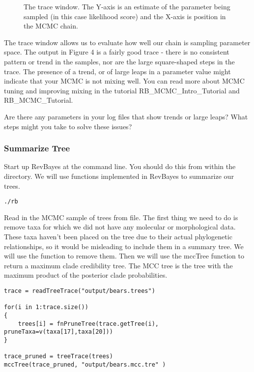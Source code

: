 \begin{figure}[h!]
\centering
{}
\caption{\small The trace window. The Y-axis is an estimate of the parameter being sampled (in this case likelihood score) and the X-axis is position in the MCMC chain.}
\label{fig:tracer}
\end{figure}
The trace window allows us to evaluate how well our chain is sampling parameter space. The output in Figure 4 is a fairly good trace - there is no consistent pattern or trend in the samples, nor are the large square-shaped steps in the trace. The presence of a trend, or of large leaps in a parameter value might indicate that your MCMC is not mixing well. You can read more about MCMC tuning and improving mixing in the tutorial RB\_MCMC\_Intro\_Tutorial and RB\_MCMC\_Tutorial. \par

Are there any parameters in your log files that show trends or large leaps? What steps might you take to solve these issues? \par



\medskip
\subsubsection{Summarize Tree}\label{subsub:RB-SummarizeTree}


Start up RevBayes at the command line. You should do this from within the \\ directory. We will use functions implemented in RevBayes to summarize our trees.
{\tt \begin{snugshade*}
\begin{lstlisting}
./rb
\end{lstlisting}
\end{snugshade*}}

Read in the MCMC sample of trees from file. The first thing we need to do is remove taxa for which we did not have any molecular or morphological data. These taxa haven't been placed on the tree due to their actual phylogenetic relationships, so it would be misleading to include them in a  summary tree. We will use the  function to remove them. Then we will use the mccTree function to return a maximum clade credibility tree. The MCC tree is the tree with the maximum product of the posterior clade probabilities.  \par
{\tt \begin{snugshade*}
\begin{lstlisting}
trace = readTreeTrace("output/bears.trees")

for(i in 1:trace.size())
{
    trees[i] = fnPruneTree(trace.getTree(i), pruneTaxa=v(taxa[17],taxa[20]))
}

trace_pruned = treeTrace(trees)
mccTree(trace_pruned, "output/bears.mcc.tre" )
\end{lstlisting}
\end{snugshade*}}

